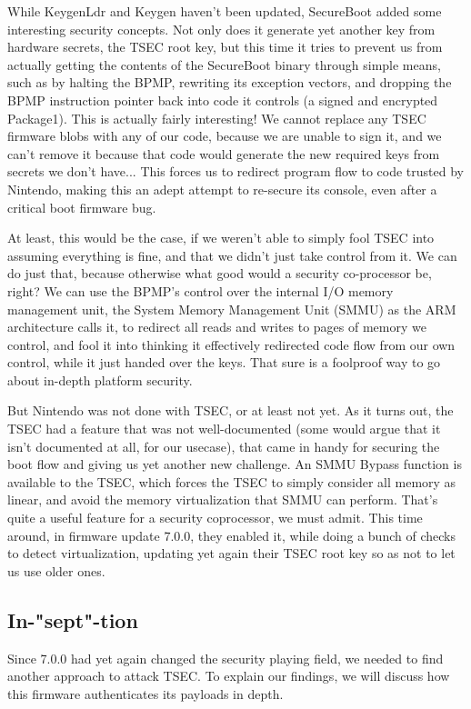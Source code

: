 \documentclass[journal]{IEEEtran}
\begin{document}
While KeygenLdr and Keygen haven't been updated, SecureBoot added some interesting security
concepts. Not only does it generate yet another key from hardware secrets, the TSEC root key,
but this time it tries to prevent us from actually getting the contents of the SecureBoot binary
through simple means, such as by halting the BPMP, rewriting its exception vectors, and dropping
the BPMP instruction pointer back into code it controls (a signed and encrypted Package1).
This is actually fairly interesting! We cannot replace any TSEC firmware
blobs with any of our code, because we are unable to sign it, and we can't remove it because that
code would generate the new required keys from secrets we don't have... This forces us to redirect
program flow to code trusted by Nintendo, making this an adept attempt to re-secure its console,
even after a critical boot firmware bug.

At least, this would be the case, if we weren't able to simply fool TSEC into assuming everything is
fine, and that we didn't just take control from it.
We can do just that, because otherwise what good would a security co-processor be, right?
We can use the BPMP's control over the internal I/O memory management unit, the System Memory
Management Unit (SMMU) as the ARM architecture calls it, to redirect all reads and writes to pages
of memory we control, and fool it into thinking it effectively redirected code flow from our own
control, while it just handed over the keys. That sure is a foolproof way to go about in-depth
platform security.

But Nintendo was not done with TSEC, or at least not yet. As it turns out, the TSEC had a feature
that was not well-documented (some would argue that it isn't documented at all, for our usecase),
that came in handy for securing the boot flow and giving us
yet another new challenge. An SMMU Bypass function is available to the TSEC, which forces the TSEC
to simply consider all memory as linear, and avoid the memory virtualization that SMMU can perform.
That's quite a useful feature for a security coprocessor, we must admit. This time around, in
firmware update 7.0.0, they enabled it, while doing a bunch of checks to detect virtualization,
updating yet again their TSEC root key so as not to let us use older ones.

\subsection{In-"sept"-tion}

Since 7.0.0 had yet again changed the security playing field, we needed to find another approach
to attack TSEC.  To explain our findings, we will discuss how this firmware authenticates its
payloads in depth.
\end{document}
